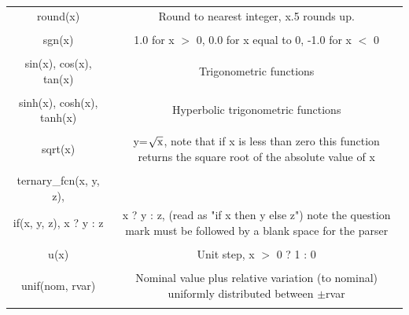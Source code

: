 \begin{longtable}{c c}
round(x) & \begin{minipage}{20em}
Round to nearest integer, x.5 rounds up.
\end{minipage}\\ \\

sgn(x) & \begin{minipage}{20em}
1.0 for x $>$ 0, 0.0 for x equal to 0, -1.0 for x $<$ 0 
\end{minipage}\\ \\

sin(x), cos(x), tan(x) & \begin{minipage}{20em}
Trigonometric functions
\end{minipage}\\ \\

sinh(x), cosh(x), tanh(x) & \begin{minipage}{20em}
Hyperbolic trigonometric functions
\end{minipage}\\ \\

sqrt(x) & \begin{minipage}{20em}
y=$\sqrt{\rm{x}}$, note that if x is less than zero this function returns the square root of the absolute value of x
\end{minipage}\\ \\

ternary\_fcn(x, y, z), \\
if(x, y, z), x ? y : z & \begin{minipage}{20em}
x ? y : z, (read as "if x then y else z") note the question mark must be followed by a blank space for the parser
\end{minipage}\\ \\

u(x) & \begin{minipage}{20em}
Unit step, x $>$ 0 ? 1 : 0
\end{minipage}\\ \\

unif(nom, rvar) & \begin{minipage}{20em}
Nominal value plus relative variation (to nominal) uniformly distributed between $\pm$rvar
\end{minipage}\\ \\


\end{longtable}
